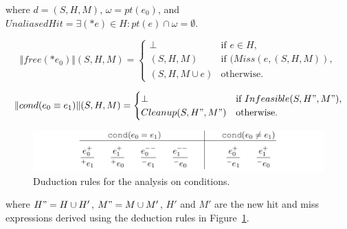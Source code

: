 where $d=(S,H,M)$, $\omega=pt(e_0)$, and 
$UnaliasedHit=\exists(*e)\in H:pt(e)\cap\omega =\emptyset$.


\[
\Vert free(*e_0) \Vert(S,H,M)=\begin{cases}
\bot& \text{if $e \in H$},\\
(S,H,M)& \text{if $(Miss(e,(S,H,M))$},\\
(S,H,M\cup {e})& \text{otherwise}.
\end{cases}
\]


\[
\Vert cond(e_0\equiv e_1)\Vert(S,H,M)=\begin{cases}
\bot& \text{if $Infeasible(S,H",M")$},\\
Cleanup(S,H",M")& \text{otherwise}.
\end{cases}
\]

\begin{figure}
  \centering
  \includegraphics[width=1.0\columnwidth]{figs/rules_cond}
   \caption{Duduction rules for the analysis on conditions.}
   \label{fig:rule_cond}
\end{figure}

where $H"=H\cup H'$, $M"=M\cup M'$, $H'$ and $M'$ are the new hit and miss 
expressions derived using the deduction rules in Figure~\ref{fig:rule_cond}.

